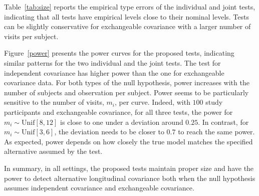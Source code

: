 \documentclass[submit]{smj}
\begin{document}
Table~\ref{tab:size} reports the empirical type \uppercase\expandafter{} errors
of the individual and joint tests, indicating that all tests have empirical levels  close to their nominal levels. Tests can be slightly conservative for exchangeable covariance with a larger number of visits per subject.

Figure~\ref{power} presents the power curves for the proposed tests, indicating similar patterns for the two individual and the joint tests. The test for independent covariance has higher power than the one for exchangeable covariance data. For both types of the null hypothesis, power increases with the number of subjects and  observation per subject. Power seems to be particularly sensitive to the number of visits,  $m_i$, per curve. Indeed, with $100$ study participants and exchangeable covariance, for all three tests, the power for $m_i \sim \text{Unif}[8,12]$ is close to one under a deviation around $0.25$. In contrast, for $m_i \sim \text{Unif}[3,6]$, the deviation needs to be closer to $0.7$ to reach the same power. As expected, power depends on how closely the true model matches the specified alternative assumed by the test.   

In summary, in all settings, the proposed tests maintain proper size and have the power to detect alternative longitudinal covariance both when the null hypothesis assumes independent covariance and exchangeable covariance.
\end{document}
